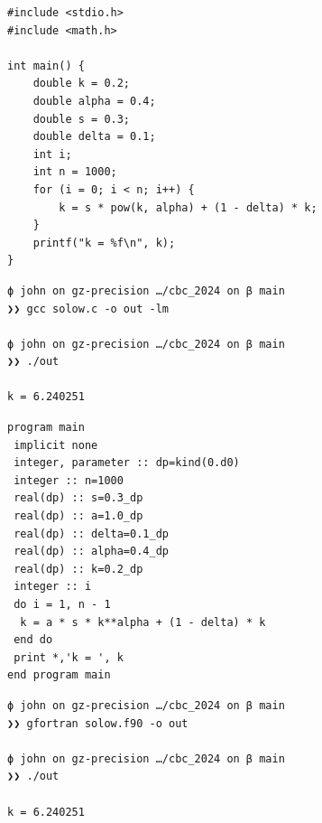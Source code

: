 \documentclass[
    xcolor={svgnames,dvipsnames},
    hyperref={colorlinks, citecolor=DeepPink4, linkcolor=DarkRed, urlcolor=DarkBlue}
    ]{beamer}  %
\newcommand{\1}{\mathbbm 1}
\begin{document}
\begin{frame}[fragile]
    
    \begin{verbatim}
#include <stdio.h>
#include <math.h>

int main() {
    double k = 0.2;
    double alpha = 0.4;
    double s = 0.3;
    double delta = 0.1;
    int i;
    int n = 1000;
    for (i = 0; i < n; i++) {
        k = s * pow(k, alpha) + (1 - delta) * k;
    }
    printf("k = %f\n", k);
}
    \end{verbatim}

\end{frame}



\begin{frame}[fragile]
    
    \begin{verbatim}
ϕ john on gz-precision …/cbc_2024 on β main
❯❯ gcc solow.c -o out -lm

ϕ john on gz-precision …/cbc_2024 on β main
❯❯ ./out 

k = 6.240251
    \end{verbatim}

\end{frame}



\begin{frame}[fragile]
    
    \begin{verbatim}
program main
 implicit none
 integer, parameter :: dp=kind(0.d0)                          
 integer :: n=1000
 real(dp) :: s=0.3_dp
 real(dp) :: a=1.0_dp
 real(dp) :: delta=0.1_dp
 real(dp) :: alpha=0.4_dp
 real(dp) :: k=0.2_dp
 integer :: i
 do i = 1, n - 1                                                
  k = a * s * k**alpha + (1 - delta) * k
 end do
 print *,'k = ', k
end program main
    \end{verbatim}

\end{frame}


\begin{frame}[fragile]
    
    \begin{verbatim}
ϕ john on gz-precision …/cbc_2024 on β main
❯❯ gfortran solow.f90 -o out 

ϕ john on gz-precision …/cbc_2024 on β main
❯❯ ./out 

k = 6.240251
    \end{verbatim}

\end{frame}
\end{document}

